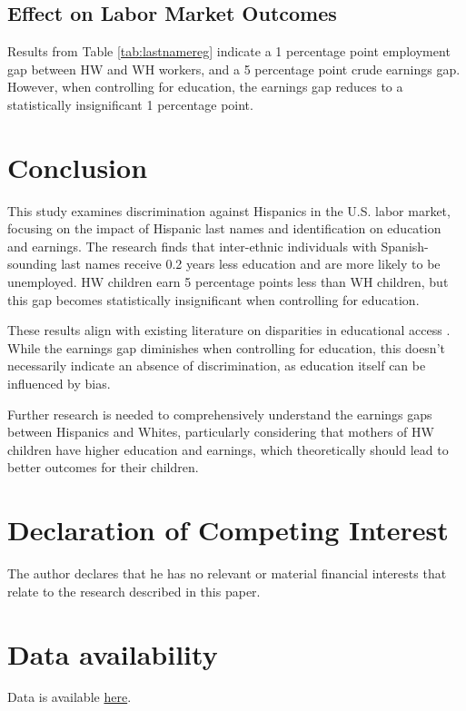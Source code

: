 \documentclass[a4paper,fleqn]{cas-sc}
\begin{document}
\subsection{Effect on Labor Market Outcomes}

Results from Table \ref{tab:lastnamereg} indicate a 1 percentage point employment gap between HW and WH workers, and a 5 percentage point crude earnings gap. However, when controlling for education, the earnings gap reduces to a statistically insignificant 1 percentage point.

\section{Conclusion}\label{sec:con1}

This study examines discrimination against Hispanics in the U.S. labor market, focusing on the impact of Hispanic last names and identification on education and earnings. The research finds that inter-ethnic individuals with Spanish-sounding last names receive 0.2 years less education and are more likely to be unemployed. HW children earn 5 percentage points less than WH children, but this gap becomes statistically insignificant when controlling for education.

These results align with existing literature on disparities in educational access \citep{bergman2018education,gaddis2024racial}. While the earnings gap diminishes when controlling for education, this doesn't necessarily indicate an absence of discrimination, as education itself can be influenced by bias.

Further research is needed to comprehensively understand the earnings gaps between Hispanics and Whites, particularly considering that mothers of HW children have higher education and earnings, which theoretically should lead to better outcomes for their children.


\section*{Declaration of Competing Interest}
The author declares that he has no relevant or material financial interests that relate to the research described in this paper.

\section*{Data availability}

Data is available \href{https://github.com/hhadah/hispanic-last-names/tree/main/data/datasets}{here}.

\newpage
\clearpage



\newpage
\clearpage


\newpage
\clearpage



\newpage
\clearpage



\newpage
\clearpage


\end{document}
